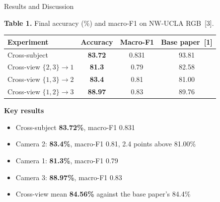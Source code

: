 \documentclass{article}
\newcommand\smalltext{\fontsize{15}{18.5}\selectfont}
\begin{document}
\begin{psec}{Results and Discussion}
\begin{minipage}[t]{0.58\linewidth}
\vspace{0pt}\centering
{\smalltext\textbf{Table 1.} Final accuracy (\%) and macro-F1 on NW-UCLA RGB~[3].}\\[2mm]
{\fontsize{16}{20.5}\selectfont
\renewcommand{\arraystretch}{1.18}
\begin{tabular}{@{}lccc@{}}
\toprule
Experiment & Accuracy & Macro-F1 & Base paper~[1]\\\midrule
Cross-subject & \textbf{83.72} & 0.831 & 93.81\\
Cross-view $\{2,3\}\to1$ & \textbf{81.3} & 0.79 & 82.58\\
Cross-view $\{1,3\}\to2$ & \textbf{83.4} & 0.81 & 81.00\\
Cross-view $\{1,2\}\to3$ & \textbf{88.97} & 0.83 & 89.76\\\bottomrule
\end{tabular}}
\end{minipage}\hfill
\begin{minipage}[t]{0.39\linewidth}
\vspace{0pt}
\begin{tcolorbox}[colback=white,colframe=accent,boxrule=1.3pt,arc=2mm,left=5mm,right=4mm,top=3mm,bottom=3mm,fontupper=\fontsize{16}{20}\selectfont]
\textbf{\color{navy}Key results}
\begin{itemize}
\item Cross-subject \textbf{83.72\%}, macro-F1 0.831
\item Camera 2: \textbf{83.4\%}, macro-F1 0.81, 2.4 points above 81.00\%
\item Camera 1: \textbf{81.3\%}, macro-F1 0.79
\item Camera 3: \textbf{88.97\%}, macro-F1 0.83
\item Cross-view mean \textbf{84.56\%} against the base paper's 84.4\%
\end{itemize}
\end{tcolorbox}
\end{minipage}


\end{psec}
\end{document}
